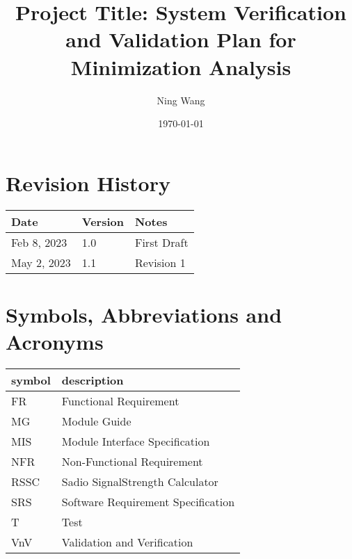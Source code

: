 \documentclass[12pt, titlepage]{article}
\begin{document}
\title{Project Title: System Verification and Validation Plan for Minimization Analysis} 
\author{Ning Wang}
\date{\today}
	
\maketitle


\section{Revision History}

\begin{tabularx}{\textwidth}{p{3cm}p{2cm}X}
\toprule {\bf Date} & {\bf Version} & {\bf Notes}\\
\midrule
Feb 8, 2023 & 1.0 & First Draft\\
May 2, 2023 & 1.1 & Revision 1\\
\bottomrule
\end{tabularx}

\newpage

\tableofcontents

\listoftables



\newpage

\section{Symbols, Abbreviations and Acronyms}

\renewcommand{\arraystretch}{1.2}
\begin{tabular}{l l} 
  \toprule		
  \textbf{symbol} & \textbf{description}\\
  \midrule 
  FR & Functional Requirement\\
  MG & Module Guide\\
  MIS & Module Interface Specification\\
  NFR & Non-Functional Requirement\\
  RSSC & Sadio SignalStrength Calculator\\
  SRS & Software Requirement Specification\\
  T & Test\\
  VnV & Validation and Verification\\
  \bottomrule
\end{tabular}\\



\end{document}
